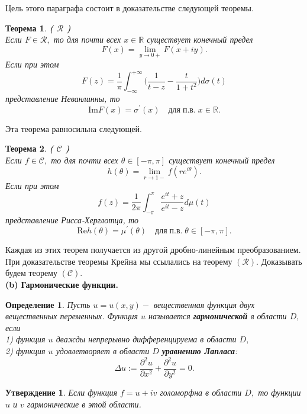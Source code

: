 \documentclass[12 pt, a4 paper]{article}
\theoremstyle{plain}   \newtheorem{Pro}{Задача}
\newtheorem{Sta}{Утверждение}
\newtheorem{Def}{Определение}
\newtheorem{The}{Теорема}
\begin{document}
Цель этого параграфа состоит в доказательстве следующей теоремы.
\begin{The}
{\bfseries ( $ \mathcal{R} $ ) }
\\
Если
$ F \in \mathcal{R} , $
то для почти всех
$ x \in \mathbb{R} $
существует конечный предел
$$
  F(x)=\lim _{y \rightarrow 0+} F(x+iy).
$$
Если при этом
$$
  F(z)= \frac{1}{\pi} \int _{-\infty}^{+\infty}
  \biggl ( \frac{1}{t-z}-\frac{t}{1+t^2} \biggr )
  d\sigma (t)
$$
представление Неванлинны, то
$$
  \mathrm{Im}F(x)=\sigma ^{\prime}(x)
  \quad для \; п.в. \; x \in \mathbb{R}.
$$
\end{The}
Эта теорема равносильна следующей.
\begin{The}
{\bfseries ( $ \mathcal{C} $ )}
\\
Если
$ f \in \mathcal{C} , $
то для почти всех
$ \theta \in [-\pi , \pi ] $
существует конечный предел
$$
  h(\theta )=\lim _{r \rightarrow 1-}
  f(re^{i\theta }).
$$
Если при этом
$$
  f(z)=\frac{1}{2\pi}\int _{-\pi}^{\pi}
  \frac{e^{it}+z}{e^{it}-z}d \mu (t)
$$
представление Рисса-Херглотца, то
$$
  \mathrm{Re}h(\theta )= \mu ^{\prime }(\theta )
  \quad для \; п.в. \; \theta \in [-\pi ,\pi ] .
$$
\end{The}
Каждая из этих теорем получается из другой дробно-линейным
преобразованием. При доказательстве теоремы Крейна мы
ссылались на теорему
$ ( \mathcal{R} ) . $
Доказывать будем теорему
$ ( \mathcal{C} ) . $
\\
{\bfseries (b) Гармонические функции.}
\begin{Def}
Пусть
$ u=u(x,y) - $
вещественная функция двух вещественных переменных. Функция
$ u $
называется
{\bfseries гармонической}
в области
$ D , $
если
\\
1) функция
$ u $
дважды непрерывно дифференцируема в области
$ D , $
\\
2) функция
$ u $
удовлетворяет в области
$ D $
{\bfseries уравнению Лапласа}:
$$
  \Delta u := \frac{\partial ^2 u}{\partial x^2}+
  \frac{\partial ^2 u}{\partial y^2} =0.
$$
\end{Def}
\begin{Sta}
Если функция
$ f=u+iv $
голоморфна в области
$ D , $
то функции
$ u $
и
$ v $
гармонические в этой области.
\end{Sta}
\end{document}
